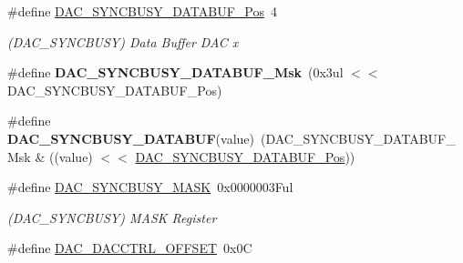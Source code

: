 \begin{DoxyCompactItemize}
\item 
\hypertarget{group___s_a_m_l21___d_a_c_ga04b32c9d531c11ebc9ded7e77709d39e}{}\#define \hyperlink{group___s_a_m_l21___d_a_c_ga04b32c9d531c11ebc9ded7e77709d39e}{D\+A\+C\+\_\+\+S\+Y\+N\+C\+B\+U\+S\+Y\+\_\+\+D\+A\+T\+A\+B\+U\+F\+\_\+\+Pos}~4\label{group___s_a_m_l21___d_a_c_ga04b32c9d531c11ebc9ded7e77709d39e}

\begin{DoxyCompactList}\small\item\em (D\+A\+C\+\_\+\+S\+Y\+N\+C\+B\+U\+S\+Y) Data Buffer D\+A\+C x \end{DoxyCompactList}\item 
\hypertarget{group___s_a_m_l21___d_a_c_ga90c66bc3b5acbc37428c0204e42ff9fc}{}\#define {\bfseries D\+A\+C\+\_\+\+S\+Y\+N\+C\+B\+U\+S\+Y\+\_\+\+D\+A\+T\+A\+B\+U\+F\+\_\+\+Msk}~(0x3ul $<$$<$ D\+A\+C\+\_\+\+S\+Y\+N\+C\+B\+U\+S\+Y\+\_\+\+D\+A\+T\+A\+B\+U\+F\+\_\+\+Pos)\label{group___s_a_m_l21___d_a_c_ga90c66bc3b5acbc37428c0204e42ff9fc}

\item 
\hypertarget{group___s_a_m_l21___d_a_c_gadfb2f74717ac4791a1b8ccd0e9be9699}{}\#define {\bfseries D\+A\+C\+\_\+\+S\+Y\+N\+C\+B\+U\+S\+Y\+\_\+\+D\+A\+T\+A\+B\+U\+F}(value)~(D\+A\+C\+\_\+\+S\+Y\+N\+C\+B\+U\+S\+Y\+\_\+\+D\+A\+T\+A\+B\+U\+F\+\_\+\+Msk \& ((value) $<$$<$ \hyperlink{group___s_a_m_l21___d_a_c_ga04b32c9d531c11ebc9ded7e77709d39e}{D\+A\+C\+\_\+\+S\+Y\+N\+C\+B\+U\+S\+Y\+\_\+\+D\+A\+T\+A\+B\+U\+F\+\_\+\+Pos}))\label{group___s_a_m_l21___d_a_c_gadfb2f74717ac4791a1b8ccd0e9be9699}

\item 
\hypertarget{group___s_a_m_l21___d_a_c_ga9f12d800862e02454c05ef89c9fb3b88}{}\#define \hyperlink{group___s_a_m_l21___d_a_c_ga9f12d800862e02454c05ef89c9fb3b88}{D\+A\+C\+\_\+\+S\+Y\+N\+C\+B\+U\+S\+Y\+\_\+\+M\+A\+S\+K}~0x0000003\+Ful\label{group___s_a_m_l21___d_a_c_ga9f12d800862e02454c05ef89c9fb3b88}

\begin{DoxyCompactList}\small\item\em (D\+A\+C\+\_\+\+S\+Y\+N\+C\+B\+U\+S\+Y) M\+A\+S\+K Register \end{DoxyCompactList}\item 
\hypertarget{group___s_a_m_l21___d_a_c_ga84ebc513c3813810220d0effb64d32a6}{}\#define \hyperlink{group___s_a_m_l21___d_a_c_ga84ebc513c3813810220d0effb64d32a6}{D\+A\+C\+\_\+\+D\+A\+C\+C\+T\+R\+L\+\_\+\+O\+F\+F\+S\+E\+T}~0x0\+C\label{group___s_a_m_l21___d_a_c_ga84ebc513c3813810220d0effb64d32a6}


\end{DoxyCompactItemize}
